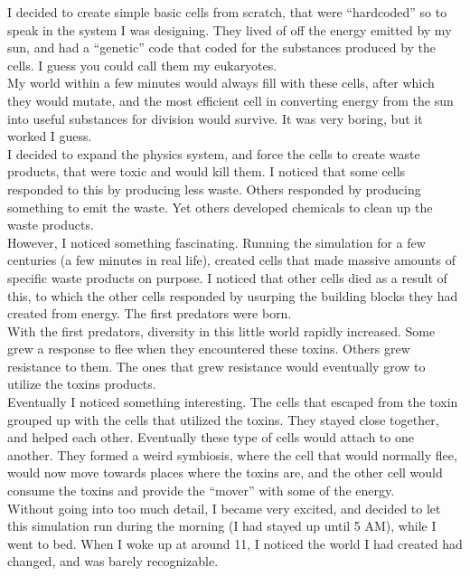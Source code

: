 \documentclass[a5paper]{scrartcl}
\begin{document}
I decided to create simple basic cells from scratch, that were \enquote{hardcoded} so to speak in the system I was designing. They lived of off the energy emitted by my sun, and had a \enquote{genetic} code that coded for the substances produced by the cells. I guess you could call them my eukaryotes.\\


My world within a few minutes would always fill with these cells, after which they would mutate, and the most efficient cell in converting energy from the sun into useful substances for division would survive. It was very boring, but it worked I guess.\\


I decided to expand the physics system, and force the cells  to create waste products, that were toxic and would kill them. I noticed that some cells responded to this by producing less waste. Others responded by producing something to emit the waste. Yet others developed chemicals to clean up the waste products.\\


However, I noticed something fascinating. Running the simulation for a few centuries (a few minutes in real life), created cells that made massive amounts of specific waste products on purpose. I noticed that other cells died as a result of this, to which the other cells responded by usurping the building blocks they had created from energy. The first predators were born.\\


With the first predators, diversity in this little world rapidly increased. Some grew a response to flee when they encountered these toxins. Others grew resistance to them. The ones that grew resistance would eventually grow to utilize the toxins products.\\


Eventually I noticed something interesting. The cells that escaped from the toxin grouped up with the cells that utilized the toxins. They stayed close together, and helped each other. Eventually these type of cells would attach to one another. They formed a weird symbiosis, where the cell that would normally flee, would now move towards places where the toxins are, and the other cell would consume the toxins and provide the \enquote{mover} with some of the energy.\\


Without going into too much detail, I became very excited, and decided to let this simulation run during the morning (I had stayed up until 5 AM), while I went to bed. When I woke up at around 11, I noticed the world I had created had changed, and was barely recognizable. \\
\end{document}
